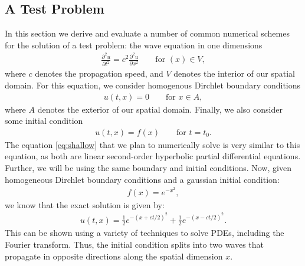 \documentclass[../main.tex]{subfiles}
\begin{document}
\subsection{A Test Problem}
In this section we derive and evaluate a number of common numerical schemes for the solution of a test problem: the wave equation in one dimensions
\begin{gather}\label{eq:wave}
    \frac{\partial^2 u}{\partial t^2} = c^2\frac{\partial^2 u}{\partial x^2}\qquad\text{for }(x)\in V,
\end{gather}
where $c$ denotes the propagation speed, and $V$ denotes the interior of our spatial domain. For this equation, we consider homogenous Dirchlet boundary conditions
\begin{gather*}\label{eq:bcs}
    u(t,x) = 0\qquad\text{for }x\in A,
\end{gather*}
where $A$ denotes the exterior of our spatial domain. Finally, we also consider some initial condition
\begin{gather*}\label{eq:ic}
    u(t,x) = f(x)\qquad\text{for }t=t_0.
\end{gather*}
The equation \ref{eq:shallow}  that we plan to numerically solve is very similar to this equation, as both are linear second-order hyperbolic partial differential equations. Further, we will be using the same boundary and initial conditions. Now, given homogeneous Dirchlet boundary conditions and a gaussian initial condition:
\begin{gather*}
    f(x) = e^{-x^2},
\end{gather*}
we know that the exact solution is given by:
\begin{gather*}
    u(t,x) = \frac{1}{2}e^{-(x+ct/2)^2} + \frac{1}{2}e^{-(x-ct/2)^2}.
\end{gather*}
This can be shown using a variety of techniques to solve PDEs, including the Fourier transform. Thus, the initial condition splits into two waves that propagate in opposite directions along the spatial dimension $x$.
\end{document}
